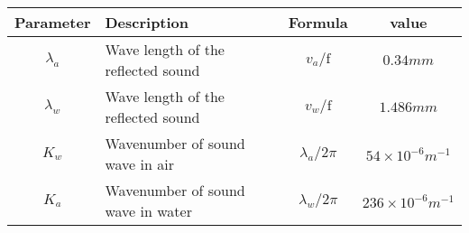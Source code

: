 \renewcommand{\arraystretch}{2}
\begin{tabular}{|c|p{2cm}|c|c|}
\hline 
\textbf{Parameter}  &\textbf{Description} &\textbf{Formula} &\textbf{value} \\
\hline
$\lambda_a$ & Wave length of the reflected sound & $v_a/\text{f}$& $0.34mm$  \\
\hline
$\lambda_w$ &  Wave length of the reflected sound & $v_w/\text{f}$ &$1.486mm$ \\
\hline
$K_w$ & Wavenumber of sound wave in air & $\lambda_a/2\pi$ & $54 \times 10^{-6} m^{-1}$ \\
\hline
$K_a$ & Wavenumber of sound wave in water & $\lambda_w/2\pi$ & $236 \times 10^{-6} m^{-1}$ \\
\hline
\end{tabular}
